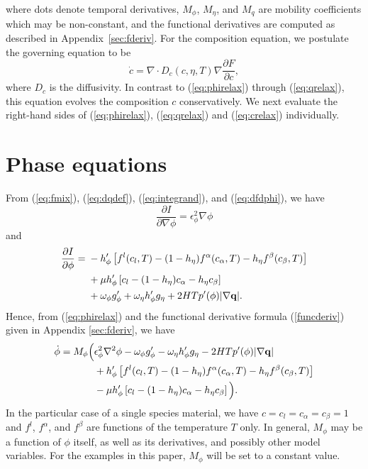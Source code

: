 %
where dots denote temporal derivatives, $M_{\phi}$, $M_{\eta}$, and
$M_q$ are mobility coefficients which may be non-constant, and the
functional derivatives are computed as described in
Appendix~\ref{sec:fderiv}.  For the composition equation, we postulate
the governing equation to be \cite{PhysRevA.45.7424}
%
\begin{equation}
  \dot{c} = \nabla \cdot D_c(c,\eta,T) \nabla
  \frac{\partial F}{\partial c},
\label{eq:crelax}
\end{equation}
%
where $D_c$ is the diffusivity. In contrast to (\ref{eq:phirelax})
through (\ref{eq:qrelax}), this equation evolves the composition $c$
conservatively.  We next evaluate the right-hand sides of
(\ref{eq:phirelax}), (\ref{eq:qrelax}) and (\ref{eq:crelax})
individually.

%
\section{Phase equations}

From (\ref{eq:fmix}), (\ref{eq:dqdef}), (\ref{eq:integrand}), and
(\ref{eq:dfdphi}), we have
%
\begin{equation}
  \frac{\partial I}{\partial \nabla \phi} = \epsilon_{\phi}^2 \nabla \phi
\end{equation}
%
and
%
\begin{equation}
\begin{split}
  \frac{\partial I}{\partial \phi} = {}
  & - h'_\phi \left[
    f^l(c_l,T) - ( 1 - h_\eta ) f^\alpha(c_\alpha,T)
    - h_\eta f^\beta(c_\beta,T) \right]
  \\ & + \mu h'_\phi \left[
    c_l - ( 1 - h_\eta ) c_\alpha
    - h_\eta c_\beta \right]
  \\ & + \omega_\phi g'_\phi + \omega_\eta h'_\phi g_\eta
    + 2 H T p'(\phi) | \nabla {\bf q} |.
\end{split}
\end{equation}
%
Hence, from (\ref{eq:phirelax}) and the functional derivative formula
(\ref{funcderiv}) given in Appendix \ref{sec:fderiv}, we have
%
\begin{equation}
\begin{split}
  \dot{\phi} =
  M_\phi \Big(
  & \epsilon_{\phi}^2 \nabla^2 \phi 
    - \omega_\phi g'_\phi - \omega_\eta h'_\phi g_\eta
    - 2 H T p'(\phi) | \nabla {\bf q} |
  \\ &
    + h'_\phi \left[
    f^l(c_l,T) - ( 1 - h_\eta ) f^\alpha(c_\alpha,T)
    - h_\eta f^\beta(c_\beta,T) \right]
  \\ & - \mu h'_\phi \left[
    c_l - ( 1 - h_\eta ) c_\alpha
    - h_\eta c_\beta \right]
  \Big).
\label{eq:phaseeom}
\end{split}
\end{equation}
%
In the particular case of a single species material, we have
$c=c_l=c_\alpha=c_\beta=1$ and $f^l$, $f^\alpha$, and $f^\beta$ are
functions of the temperature $T$ only.
%
In general, $M_\phi$ may be a function of $\phi$ itself, as well as
its derivatives, and possibly other model variables.  For the examples
in this paper, $M_\phi$ will be set to a constant value.

